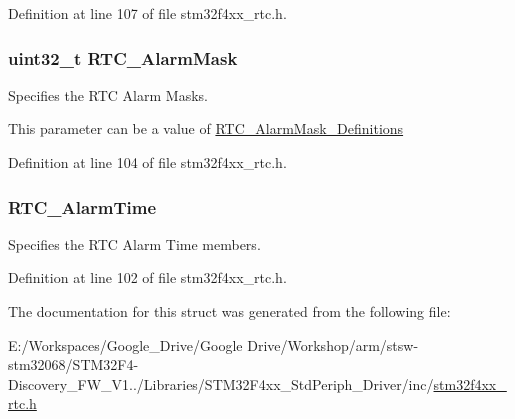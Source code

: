 Definition at line 107 of file stm32f4xx\-\_\-rtc.\-h.

\hypertarget{struct_r_t_c___alarm_type_def_a0257c34b484be71007c338374f9fd8fc}{
\subsubsection[{R\-T\-C\-\_\-\-Alarm\-Mask}]{\setlength{\rightskip}{0pt plus 5cm}uint32\-\_\-t R\-T\-C\-\_\-\-Alarm\-Mask}}\label{struct_r_t_c___alarm_type_def_a0257c34b484be71007c338374f9fd8fc}
\begin{DoxyVerb} Specifies the RTC Alarm Masks.
\end{DoxyVerb}
 This parameter can be a value of \hyperlink{group___r_t_c___alarm_mask___definitions}{R\-T\-C\-\_\-\-Alarm\-Mask\-\_\-\-Definitions} 

Definition at line 104 of file stm32f4xx\-\_\-rtc.\-h.

\hypertarget{struct_r_t_c___alarm_type_def_a87078823f156d88aa21b0a1c43cb985c}{
\subsubsection[{R\-T\-C\-\_\-\-Alarm\-Time}]{ R\-T\-C\-\_\-\-Alarm\-Time}}\label{struct_r_t_c___alarm_type_def_a87078823f156d88aa21b0a1c43cb985c}
Specifies the R\-T\-C Alarm Time members. 

Definition at line 102 of file stm32f4xx\-\_\-rtc.\-h.



The documentation for this struct was generated from the following file\-:\begin{DoxyCompactItemize}
\item 
E\-:/\-Workspaces/\-Google\-\_\-\-Drive/\-Google Drive/\-Workshop/arm/stsw-\/stm32068/\-S\-T\-M32\-F4-\/\-Discovery\-\_\-\-F\-W\-\_\-\-V1../\-Libraries/\-S\-T\-M32\-F4xx\-\_\-\-Std\-Periph\-\_\-\-Driver/inc/\hyperlink{stm32f4xx__rtc_8h}{stm32f4xx\-\_\-rtc.\-h}\end{DoxyCompactItemize}
